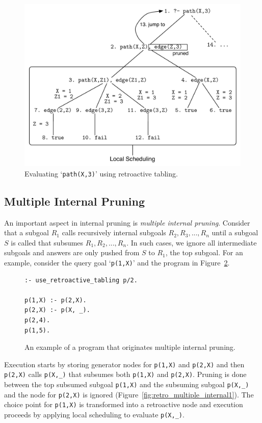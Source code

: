\begin{figure}[ht]
  \centering
    \includegraphics[scale=0.7]{retro_path.pdf}
  \caption{Evaluating `\texttt{path(X,3)}' using retroactive tabling.}
  \label{fig:retro_path}
\end{figure}

\subsection{Multiple Internal Pruning}

An important aspect in internal pruning is \textit{multiple internal pruning}.
Consider that a subgoal $R_1$ calls recursively internal subgoals $R_2, R_3, ..., R_n$ until a subgoal
$S$ is called that subsumes $R_1, R_2, ..., R_n$. In such cases, we ignore all intermediate subgoals
and answers are only pushed from $S$ to $R_1$, the top subgoal. 
For an example, consider the query goal `\texttt{p(1,X)}' and the program in Figure~\ref{fig:retro_multiple_internal_program}.

\begin{figure}[ht]
\begin{Verbatim}
:- use_retroactive_tabling p/2.

p(1,X) :- p(2,X).
p(2,X) :- p(X, _).
p(2,4).
p(1,5).
\end{Verbatim}
\caption{An example of a program that originates multiple internal pruning.}
\label{fig:retro_multiple_internal_program}
\end{figure}

Execution starts by storing generator nodes for \texttt{p(1,X)} and \texttt{p(2,X)} and then
\texttt{p(2,X)} calls \texttt{p(X,\_)} that subsumes both \texttt{p(1,X)} and \texttt{p(2,X)}.
Pruning is done between the top subsumed subgoal \texttt{p(1,X)} and the subsuming subgoal
\texttt{p(X,\_)} and the node for \texttt{p(2,X)} is ignored (Figure~\ref{fig:retro_multiple_internal1}).
The choice point for \texttt{p(1,X)} is transformed into a retroactive node and execution proceeds by
applying local scheduling to evaluate \texttt{p(X,\_)}.

